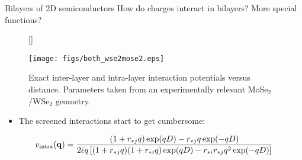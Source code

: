 \documentclass[12pt, pdf, hyperref={draft}, usenames, dvipsnames]{beamer}
\begin{document}
\begin{frame}{Bilayers of 2D semiconductors}
How do charges interact in bilayers? More special functions?
\begin{figure}[H]
  [\FBwidth]
  {\caption{Exact inter-layer and intra-layer interaction potentials versus
  distance. Parameters taken from an experimentally relevant MoSe$_2$/WSe$_2$
  geometry.}\label{fig:interactions}}
  {\texttt{[image: figs/both\_wse2mose2.eps]}}
\end{figure}

\begin{itemize}
  \item The screened interactions start to get cumbersome:
\end{itemize}
\begin{equation}
  v_{\text{intra}}({\bf q}) =
  \frac{(1+r_{*j}q)\exp(qD)
  -r_{*j}q\exp(-qD)}{2\bar{\epsilon}
  q\left[(1+r_{*j}q)(1+r_{*i}q)\exp(qD)-
  r_{*i}r_{*j}q^2\exp(-qD)\right]} \label{eq:intralayer_pot}
\end{equation}
\end{frame}

%
%
%
%
%
%
\end{document}
